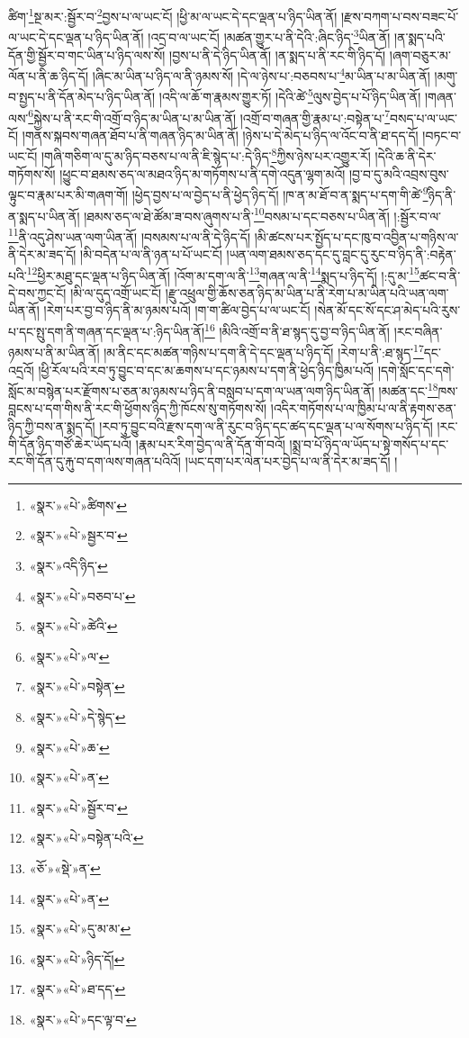 ཚིག་\footnote{«སྣར་»«པེ་»ཚིགས་}སྔ་མར་:སྦྱོར་བ་\footnote{«སྣར་»«པེ་»སྦྱར་བ་}བྱས་པ་ལ་ཡང་ངོ། །ཕྱི་མ་ལ་ཡང་དེ་དང་ལྡན་པ་ཉིད་ཡིན་ནོ། །རྫས་བཀག་པ་བས་བཟང་པོ་ལ་ཡང་དེ་དང་ལྡན་པ་ཉིད་ཡིན་ནོ། །འདྲ་བ་ལ་ཡང་ངོ། །མཚན་གྱུར་པ་ནི་དེའི་:ཞིང་ཉིད་\footnote{«སྣར་»འདི་ཉིད་}ཡིན་ནོ། །ན་སྨད་པའི་དོན་གྱི་སྦྱོར་བ་གང་ཡིན་པ་ཉིད་ལས་སོ། །བྱས་པ་ནི་དེ་ཉིད་ཡིན་ནོ། །ན་སྨད་པ་ནི་རང་གི་ཉིད་དོ། །ཞག་བཅུར་མ་ལོན་པ་ནི་ཆ་ཉིད་དོ། །ཞིང་མ་ཡིན་པ་ཉིད་ལ་ནི་ཉམས་སོ། །དེ་ལ་ཉེས་པ་:བཅབས་པ་\footnote{«སྣར་»«པེ་»བཅབ་པ་}མ་ཡིན་པ་མ་ཡིན་ནོ། །མགུ་བ་སྤྱད་པ་ནི་དོན་མེད་པ་ཉིད་ཡིན་ནོ། །འདི་ལ་ཆོ་ག་རྣམས་གྱུར་ཏོ། །དེའི་ཚེ་\footnote{«སྣར་»«པེ་»ཚེའི་}ལུས་བྱེད་པ་པོ་ཉིད་ཡིན་ནོ། །གཞན་ལས་\footnote{«སྣར་»«པེ་»ལ་}སྐྱེས་པ་ནི་རང་གི་འགྲོ་བ་ཉིད་མ་ཡིན་པ་མ་ཡིན་ནོ། །འགྲོ་བ་གཞན་གྱི་རྣམ་པ་:བསྟེན་པ་\footnote{«སྣར་»«པེ་»བསྟེན་}བསད་པ་ལ་ཡང་ངོ། །གནས་སྐབས་གཞན་ཐོབ་པ་ནི་གཞན་ཉིད་མ་ཡིན་ནོ། །ཉེས་པ་དེ་མེད་པ་ཉིད་ལ་འོང་བ་ནི་ཐ་དད་དོ། །བཏང་བ་ཡང་ངོ། །གཞི་གཅིག་ལ་དུ་མ་ཉིད་བཅས་པ་ལ་ནི་ཇི་སྙེད་པ་:དེ་ཉིད་\footnote{«སྣར་»«པེ་»དེ་སྙེད་}ཀྱིས་ཉེས་པར་འགྱུར་རོ། །དེའི་ཆ་ནི་དེར་གཏོགས་སོ། །ཕྱུང་བ་ཐམས་ཅད་ལ་མཐའ་ཉིད་མ་གཏོགས་པ་ནི་དགེ་འདུན་ལྷག་མའོ། །བྱ་བ་དུ་མའི་འབྲས་བུས་ལྟུང་བ་རྣམ་པར་མི་གཞག་གོ། །ཕྱེད་བྱས་པ་ལ་བྱེད་པ་ནི་ཕྱེད་ཉིད་དོ། །ཁ་ན་མ་ཐོ་བ་ན་སྨད་པ་དག་གི་ཚེ་\footnote{«སྣར་»«པེ་»ཆ་}ཉིད་ནི་ན་སྨད་པ་ཡིན་ནོ། །ཐམས་ཅད་ལ་ཐེ་ཚོམ་ཟ་བས་ཞུགས་པ་ནི་\footnote{«སྣར་»«པེ་»ན་}བསམ་པ་དང་བཅས་པ་ཡིན་ནོ། །:སྦྱོར་བ་ལ་\footnote{«སྣར་»«པེ་»སྦྱོར་བ་}ནི་འདུ་ཤེས་ཡན་ལག་ཡིན་ནོ། །བསམས་པ་ལ་ནི་དེ་ཉིད་དོ། །མི་ཚངས་པར་སྤྱོད་པ་དང་ཁུ་བ་འབྱིན་པ་གཉིས་ལ་ནི་དེར་མ་ཟད་དོ། །མི་བདེན་པ་ལ་ནི་ཉན་པ་པོ་ཡང་ངོ། །ཡན་ལག་ཐམས་ཅད་དང་དུ་བླང་དུ་རུང་བ་ཉིད་ནི་:བརྟེན་པའི་\footnote{«སྣར་»«པེ་»བསྟེན་པའི་}ཕྱིར་མཐུ་དང་ལྡན་པ་ཉིད་ཡིན་ནོ། །འོག་མ་དག་ལ་ནི་\footnote{«ཅོ་»«སྡེ་»ན་}གཞན་ལ་ནི་\footnote{«སྣར་»«པེ་»ན་}སྨད་པ་ཉིད་དོ། །:དུ་མ་\footnote{«སྣར་»«པེ་»དུ་མ་མ་}ཚང་བ་ནི་དེ་བས་ཀྱང་ངོ། །མི་ལ་དུད་འགྲོ་ཡང་ངོ། །རྫུ་འཕྲུལ་གྱི་ཆོས་ཅན་ཉིད་མ་ཡིན་པ་ནི་རེག་པ་མ་ཡིན་པའི་ཡན་ལག་ཡིན་ནོ། །རེག་པར་བྱ་བ་ཉིད་ནི་མ་ཉམས་པའོ། །ག་ག་ཚིལ་བྱེད་པ་ལ་ཡང་ངོ། །སེན་མོ་དང་སོ་དང་ཤ་མེད་པའི་རུས་པ་དང་སྤུ་དག་ནི་གཞན་དང་ལྡན་པ་:ཉིད་ཡིན་ནོ།\footnote{«སྣར་»«པེ་»ཉིད་དོ།} །མིའི་འགྲོ་བ་ནི་ཐ་སྙད་དུ་བྱ་བ་ཉིད་ཡིན་ནོ། །རང་བཞིན་ཉམས་པ་ནི་མ་ཡིན་ནོ། །མ་ནིང་དང་མཚན་གཉིས་པ་དག་ནི་དེ་དང་ལྡན་པ་ཉིད་དོ། །རེག་པ་ནི་:ཐ་སྙད་\footnote{«སྣར་»«པེ་»ཐ་དད་}དང་འདྲའོ། །ཕྱི་རོལ་པའི་རབ་ཏུ་བྱུང་བ་དང་མ་ཆགས་པ་དང་ཉམས་པ་དག་ནི་ཕྱེད་ཉིད་ཁྱིམ་པའོ། །དགེ་སློང་དང་དགེ་སློང་མ་བསྙེན་པར་རྫོགས་པ་ཅན་མ་ཉམས་པ་ཉིད་ནི་བསླབ་པ་དག་ལ་ཡན་ལག་ཉིད་ཡིན་ནོ། །མཚན་དང་\footnote{«སྣར་»«པེ་»དང་ལྟ་བ་}ཁས་བླངས་པ་དག་གིས་ནི་རང་གི་ཕྱོགས་ཉིད་ཀྱི་ཁོངས་སུ་གཏོགས་སོ། །འདིར་གཏོགས་པ་ལ་ཁྱིམ་པ་ལ་ནི་རྟགས་ཅན་ཉིད་ཀྱི་བས་ན་སྨད་དོ། །རབ་ཏུ་བྱུང་བའི་རྫས་དག་ལ་ནི་རུང་བ་ཉིད་དང་ཚད་དང་ལྡན་པ་ལ་སོགས་པ་ཉིད་དོ། །རང་གི་དོན་ཉིད་གཙོ་ཆེར་ཡོད་པའོ། །རྣམ་པར་རིག་བྱེད་ལ་ནི་དོན་གོ་བའོ། །སྨྲ་བ་པོ་ཉིད་ལ་ཡོད་པ་སྟེ་གསོད་པ་དང་རང་གི་དོན་དུ་རྐུ་བ་དག་ལས་གཞན་པའིའོ། །ཡང་དག་པར་ལེན་པར་བྱེད་པ་ལ་ནི་དེར་མ་ཟད་དོ། །
